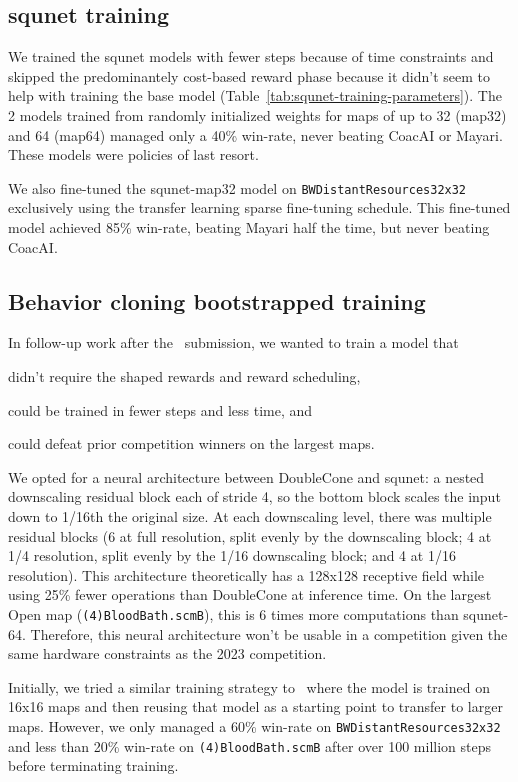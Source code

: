 \documentclass{article}
\begin{document}
\subsection{squnet training}
We trained the squnet models with fewer steps because of time constraints and skipped the
predominantely cost-based reward phase because it didn't seem to help with training the
base model (Table~\ref{tab:squnet-training-parameters}). The 2 models trained from randomly 
initialized weights for maps of up to 32 (map32) and 64 (map64) managed only a 40\% 
win-rate, never beating CoacAI or Mayari. These models were policies of last resort.

We also fine-tuned the squnet-map32 model on \texttt{BWDistantResources32x32}
exclusively using the transfer learning sparse fine-tuning schedule. This fine-tuned 
model achieved 85\% win-rate, beating Mayari half the time, but never beating CoacAI.

\subsection{Behavior cloning bootstrapped training}
In follow-up work after the \agentName\ submission, we wanted to train a model that
\begin{inparaenum}[(1)]
    \item didn't require the shaped rewards and reward scheduling,
    \item could be trained in fewer steps and less time, and
    \item could defeat prior competition winners on the largest maps.
\end{inparaenum}
We opted for a neural architecture between DoubleCone and squnet: a nested downscaling residual
block each of stride 4, so the bottom block scales the input down to 1/16th the original
size. At each downscaling level, there was multiple residual blocks (6 at full
resolution, split evenly by the downscaling block; 4 at 1/4 resolution, split evenly by
the 1/16 downscaling block; and 4 at 1/16 resolution). This architecture theoretically
has a 128x128 receptive field while using 25\% fewer operations than DoubleCone at inference time. On
the largest Open map (\texttt{(4)BloodBath.scmB}), this is 6 times more
computations than squnet-64. Therefore, this neural architecture won't be usable in a
competition given the same hardware constraints as the 2023 competition.

Initially, we tried a similar training strategy to \agentName\ where the model is
trained on 16x16 maps and then reusing that model as a starting point to transfer to
larger maps. However, we only managed a 60\% win-rate on
\texttt{BWDistantResources32x32} and less than 20\% win-rate on
\texttt{(4)BloodBath.scmB} after over 100 million
steps before terminating training.
\end{document}
